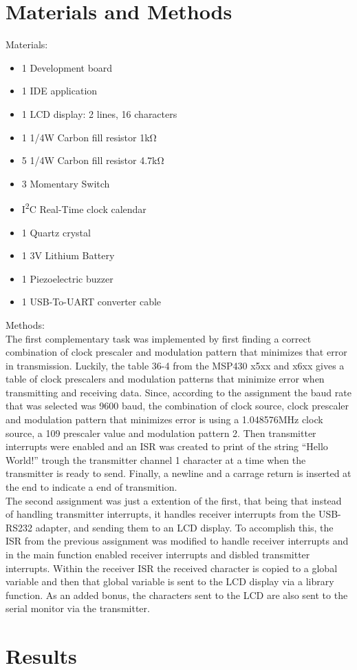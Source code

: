 \documentclass[journal]{IEEEtran}
\begin{document}
\section{Materials and Methods}
Materials:
\begin{itemize}
  \item 1 Development board
  \item 1 IDE application
  \item 1 LCD display: 2 lines, 16 characters
  \item 1 1/4\si{\watt} Carbon fill resistor 1\si{\kilo\ohm}
  \item 5 1/4\si{\watt} Carbon fill resistor 4.7\si{\kilo\ohm}
  \item 3 Momentary Switch
  \item I\textsuperscript{2}C Real-Time clock calendar
  \item 1 Quartz crystal
  \item 1 3V Lithium Battery
  \item 1 Piezoelectric buzzer
  \item 1 USB-To-UART converter cable
\end{itemize}
Methods:\\
The first complementary task was implemented by first finding a correct combination of  clock prescaler and modulation pattern that minimizes that error in transmission. Luckily, the table 36-4 from the MSP430 x5xx and x6xx gives a table of clock prescalers and modulation patterns that minimize error when transmitting and receiving data. Since, according to the assignment the baud rate that was selected was 9600 baud, the combination of clock source, clock prescaler and modulation pattern that minimizes error is using a 1.048576\si{\mega\hertz} clock source, a 109 prescaler value and modulation pattern 2. Then transmitter interrupts were enabled and an ISR was created to print of the string ``Hello World!'' trough the transmitter channel 1 character at a time when the transmitter is ready to send. Finally, a newline and a carrage return is inserted at the end to indicate a end of transmition.\\ The second assignment was just a extention of the first, that being that instead of handling transmitter interrupts, it handles receiver interrupts from the USB-RS232 adapter, and sending them to an LCD display. To accomplish this, the ISR from the previous assignment was modified to handle receiver interrupts and in the main function enabled receiver interrupts and disbled transmitter interrupts. Within the receiver ISR the received character is copied to a global variable and then that global variable is sent to the LCD display via a library function. As an added bonus, the characters sent to the LCD are also sent to the serial monitor via the transmitter.\\
\section{Results}
\nocite{rojasEmbeddedSystemsDesign2016}
\nocite{LCDControllerDatasheets}


\end{document}
